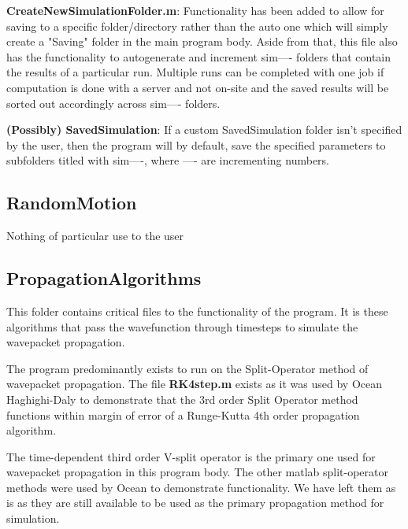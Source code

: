 \documentclass[11pt,letterpaper]{article}
\renewcommand{\\}{\bigskip}
\begin{document}
\textbf{CreateNewSimulationFolder.m}: Functionality has been added to allow for saving to a specific folder/directory rather than the auto one which will simply create a "Saving" folder in the main program body. Aside from that, this file also has the functionality to autogenerate and increment sim---- folders that contain the results of a particular run. Multiple runs can be completed with one job if computation is done with a server and not on-site and the saved results will be sorted out accordingly across sim---- folders.\\

\textbf{(Possibly) SavedSimulation}: If a custom SavedSimulation folder isn't specified by the user, then the program will by default, save the specified parameters to subfolders titled with sim----, where ---- are incrementing numbers. \\

\subsection{RandomMotion}\\

Nothing of particular use to the user\\

\subsection{PropagationAlgorithms}\\

This folder contains critical files to the functionality of the program. It is these algorithms that pass the wavefunction through timesteps to simulate the wavepacket propagation.\\

The program predominantly exists to run on the Split-Operator method of wavepacket propagation. The file \textbf{RK4step.m} exists as it was used by Ocean Haghighi-Daly to demonstrate that the 3rd order Split Operator method functions within margin of error of a Runge-Kutta 4th order propagation algorithm.\\

The time-dependent third order V-split operator is the primary one used for wavepacket propagation in this program body. The other matlab split-operator methods were used by Ocean to demonstrate functionality. We have left them as is as they are still available to be used as the primary propagation method for simulation.\\
\end{document}

